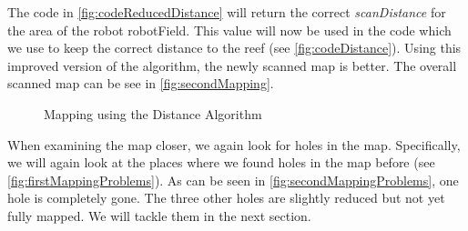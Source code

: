 \documentclass[twoside, 12pt]{article}
\begin{document}
\begin{figure}
\vspace{-50pt}
\end{figure}

The code in \autoref{fig:codeReducedDistance} will return the correct \textit{scanDistance} for the area of the robot robotField. This value will now be used in the code which we use to keep the correct distance to the reef (see \autoref{fig:codeDistance}). Using this improved version of the algorithm, the newly scanned map is better. The overall scanned map can be see in \autoref{fig:secondMapping}.\\

\begin{figure}
\vspace{0pt}
  \begin{center}
  \end{center}
\vspace{-20pt}
  \caption{Mapping using the Distance Algorithm}
  \label{fig:secondMapping}
\vspace{20pt}
\end{figure}

\begin{figure}
\vspace{-50pt}
\end{figure}

When examining the map closer, we again look for holes in the map. Specifically, we will again look at the places where we found holes in the map before (see \autoref{fig:firstMappingProblems}). As can be seen in \autoref{fig:secondMappingProblems}, one hole is completely gone. The three other holes are slightly reduced but not yet fully mapped. We will tackle them in the next section.\\
\end{document}
